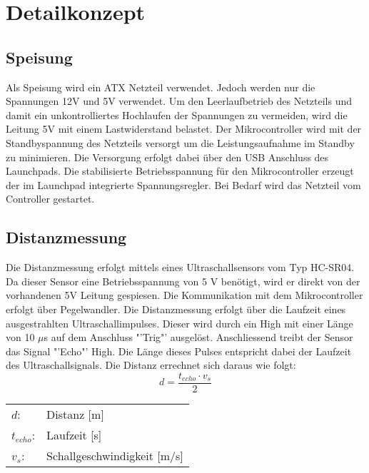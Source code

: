 



\section{Detailkonzept}

\subsection{Speisung}
Als Speisung wird ein ATX Netzteil verwendet. Jedoch werden nur die Spannungen 
12V und 5V verwendet. Um den Leerlaufbetrieb des Netzteils und damit ein 
unkontrolliertes Hochlaufen der Spannungen zu vermeiden, wird die Leitung 5V 
mit einem Lastwiderstand belastet. Der Mikrocontroller wird mit der 
Standbyspannung des Netzteils versorgt um die Leistungsaufnahme im Standby zu 
minimieren. Die Versorgung erfolgt dabei über den USB Anschluss des 
Launchpads. Die stabilisierte Betriebsspannung für den Mikrocontroller erzeugt 
der im Launchpad integrierte Spannungsregler. Bei Bedarf wird das Netzteil vom 
Controller gestartet. 

\subsection{Distanzmessung}
Die Distanzmessung erfolgt mittels eines Ultraschallsensors vom Typ HC-SR04. 
Da dieser Sensor eine Betriebsspannung von 5 V benötigt, wird er direkt von 
der vorhandenen 5V Leitung gespiesen. Die Kommunikation mit dem Mikrocontroller 
erfolgt über Pegelwandler. Die Distanzmessung erfolgt über die Laufzeit eines 
ausgestrahlten Ultraschallimpulses. Dieser wird durch ein High mit einer 
Länge von 10 $\mu$s auf dem Anschluss "'Trig"' ausgelöst. Anschliessend treibt 
der Sensor das Signal "'Echo"' High. Die Länge dieses Pulses entspricht dabei 
der Laufzeit des Ultraschallsignals. Die Distanz errechnet sich daraus wie 
folgt: 
\[ d = \frac{t_{echo} \cdot v_s}{2} \]
\begin{tabular}{@{}ll}
  $d$: & Distanz [m]\\
  $t_{echo}$: & Laufzeit [s]\\
  $v_s$: & Schallgeschwindigkeit [m/s]
\end{tabular}

